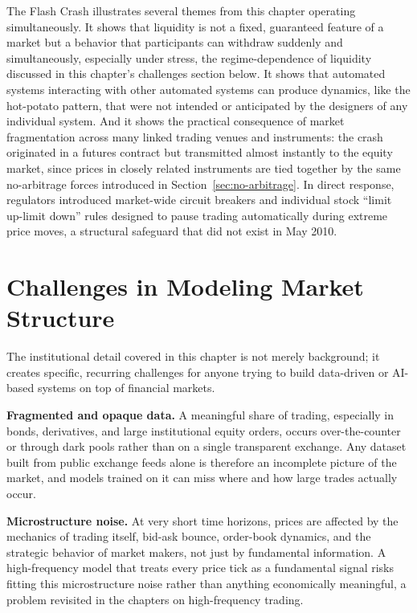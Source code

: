 \documentclass[../ai_in_finance]{subfiles}
\begin{document}
The Flash Crash illustrates several themes from this chapter operating simultaneously. It shows that liquidity is not a fixed, guaranteed feature of a market but a behavior that participants can withdraw suddenly and simultaneously, especially under stress, the regime-dependence of liquidity discussed in this chapter's challenges section below. It shows that automated systems interacting with other automated systems can produce dynamics, like the hot-potato pattern, that were not intended or anticipated by the designers of any individual system.
And it shows the practical consequence of market fragmentation across many linked trading venues and instruments: the crash originated in a futures contract but transmitted almost instantly to the equity market, since prices in closely related instruments are tied together by the same no-arbitrage forces introduced in Section~\ref{sec:no-arbitrage}. In direct response, regulators introduced market-wide circuit breakers and individual stock ``limit up-limit down'' rules designed to pause trading automatically during extreme price moves, a structural safeguard that did not exist in May 2010.

\section{Challenges in Modeling Market Structure}

The institutional detail covered in this chapter is not merely background; it creates specific, recurring challenges for anyone trying to build data-driven or AI-based systems on top of financial markets.

\textbf{Fragmented and opaque data.} A meaningful share of trading, especially in bonds, derivatives, and large institutional equity orders, occurs over-the-counter or through dark pools rather than on a single transparent exchange. Any dataset built from public exchange feeds alone is therefore an incomplete picture of the market, and models trained on it can miss where and how large trades actually occur.

\textbf{Microstructure noise.} At very short time horizons, prices are affected by the mechanics of trading itself, bid-ask bounce, order-book dynamics, and the strategic behavior of market makers, not just by fundamental information. A high-frequency model that treats every price tick as a fundamental signal risks fitting this microstructure noise rather than anything economically meaningful, a problem revisited in the chapters on high-frequency trading.
\end{document}
